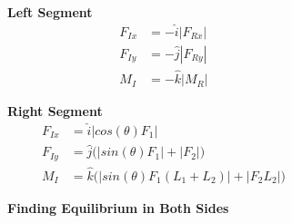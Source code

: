 \documentclass[12pt]{article}
\begin{document}
\begin{figure}[H]
  \centering
  \begin{subfigure}[H]{0.45\textwidth}
    \centering
    \textbf{Left Segment}
    \begin{align*}
      F_{Ix} &= -\hat{i}|F_{Rx}| \\
      F_{Iy} &= -\hat{j}|F_{Ry}| \\
      M_{I}  &= -\hat{k}|M_{R}|
    \end{align*}
  \end{subfigure}
  \begin{subfigure}[H]{0.45\textwidth}
    \centering
    \textbf{Right Segment}
    \begin{align*}
      F_{Ix} &= \hat{i}|cos(\theta)F_1| \\
      F_{Iy} &= \hat{j}\big(|sin(\theta)F_1| + |F_2|\big) \\
      M_{I}  &= \hat{k}\big(|sin(\theta)F_1(L_1+L_2)| + |F_2L_2|\big)
    \end{align*}
  \end{subfigure}
  \begin{subfigure}[H]{\textwidth}
    \vspace{22pt}
    \centering
    \textbf{Finding Equilibrium in Both Sides}


\end{subfigure}
\end{figure}
\end{document}
